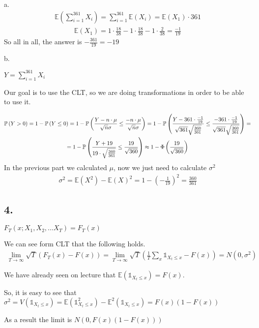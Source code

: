 a. 
\begin{gather*}
    \mathds{E}(\sum_{i=1}^{361} X_i)= \sum_{i=1}^{361} \mathds{E}(X_i) =\mathds{E}(X_1)\cdot361
\end{gather*}
\begin{gather*}
    \mathds{E}(X_1)=1\cdot\frac{18}{38}-1\cdot\frac{18}{38}-1\cdot\frac{2}{38}=\frac{-1}{19}
\end{gather*}
So all in all, the answer is $-\frac{361}{19}=-19$

b. 

$Y=\sum_{i=1}^{361} X_i$

Our goal is to use the CLT, so we are doing transformations in order to be able to use it.

\begin{gather*}
    \mathbb{P}\left( Y>0 \right) = 1- \mathbb{P}\left( Y\le 0 \right) = 1- \mathbb{P}\left( \frac{Y-n\cdot \mu}{\sqrt{n}\sigma} \le \frac{-n\cdot \mu}{\sqrt{n}\sigma}  \right) = 1- \mathbb{P}\left( \frac{Y-361\cdot \frac{-1}{19}}{\sqrt{361}\sqrt{\frac{360}{361}}} \le \frac{-361\cdot \frac{-1}{19}}{\sqrt{361}\sqrt{\frac{360}{361}}}  \right) = \\
    = 1 - \mathbb{P}\left( \frac{Y+19}{19\cdot\sqrt{\frac{360}{361}}}\le \frac{19}{\sqrt{360}} \right) \approx 1- \Phi\left(\frac{19}{\sqrt{360}}\right)
\end{gather*}
In the previous part we calculated $\mu$, now we just need to calculate $\sigma^2$
\begin{gather*}
    \sigma^2=\mathds{E}(X^2)- \mathds{E}(X)^2 = 1- \left(-\frac{1}{19}\right)^2= \frac{360}{361}
\end{gather*}

\subsection*{4.}
$F_T(x; X_1, X_2, ... X_T)=F_T(x)$

We can see form CLT that the following holds.
\begin{gather*}
    \lim_{T\to \infty} \sqrt{T}(F_T(x)-F(x))= \lim_{T\to \infty} \sqrt{T}\left(\frac{1}{T}\sum_x \mathds{1}_{X_t\le x} - F(x)\right) = N(0,\sigma^2)
\end{gather*}

We have already seen on lecture that $\mathds{E}(\mathds{1}_{X_t\le x})=F(x)$. 

So, it is easy to see that $\sigma^2= V(\mathds{1}_{X_t\le x})= \mathds{E}(\mathds{1}_{X_t\le x}^2)- \mathds{E}^2(\mathds{1}_{X_t\le x})=F(x)(1-F(x))$

As a result the limit is $N(0, F(x)(1-F(x)))$

